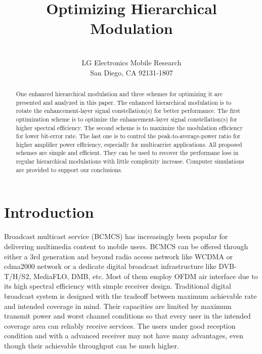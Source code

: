 \documentclass[10pt,fleqn, twocolumn]{IEEEtran}
\title{Optimizing Hierarchical Modulation}
\author{\\LG Electronics Mobile Research\\San Diego, CA 92131-1807}
\date{}
\begin{document}
\maketitle
\begin{abstract}\small
One enhanced hierarchical modulation and three schemes for
optimizing it are presented and analyzed in this paper. The
enhanced hierarchical modulation is to rotate the
enhancement-layer signal constellation(s) for better performance.
The first optimization scheme is to optimize the enhancement-layer
signal constellation(s) for higher spectral efficiency. The second
scheme is to maximize the modulation efficiency for lower
bit-error rate. The last one is to control the
peak-to-average-power ratio for higher amplifier power efficiency,
especially for multicarrier applications. All proposed schemes are
simple and efficient. They can be used to recover the performane
loss in regular hierarchical modulations with little complexity
increase. Computer simulations are provided to support our
conclusions.
\end{abstract}

\section{Introduction}
Broadcast multicast service (BCMCS) has increasingly been popular
for delivering multimedia content to mobile users. BCMCS can be
offered through either a 3rd generation and beyond radio access
network like WCDMA or cdma2000 network or a dedicate digital
broadcast infrastructure like DVB-T/H/S2, MediaFLO, DMB, etc. Most
of them employ OFDM air interface due to its high spectral
efficiency with simple receiver design. Traditional digital
broadcast system is designed with the tradeoff between maximum
achievable rate and intended coverage in mind. Their capacities
are limited by maximum transmit power and worst channel conditions
so that every user in the intended coverage area can reliably
receive services. The users under good reception condition and
with a advanced receiver may not have many advantages, even though
their achievable throughput can be much higher.
\end{document}
